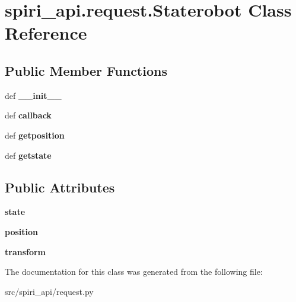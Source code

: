 \hypertarget{classspiri__api_1_1request_1_1_staterobot}{\section{spiri\-\_\-api.\-request.\-Staterobot \-Class \-Reference}
\label{classspiri__api_1_1request_1_1_staterobot}
}
\subsection*{\-Public \-Member \-Functions}
\begin{DoxyCompactItemize}
\item 
\hypertarget{classspiri__api_1_1request_1_1_staterobot_ae3e81ac6540cda7ce41cb9ac687cbff6}{def {\bfseries \-\_\-\-\_\-init\-\_\-\-\_\-}}\label{classspiri__api_1_1request_1_1_staterobot_ae3e81ac6540cda7ce41cb9ac687cbff6}

\item 
\hypertarget{classspiri__api_1_1request_1_1_staterobot_a32dd4e20d07c24f5cb292b97088fa1a5}{def {\bfseries callback}}\label{classspiri__api_1_1request_1_1_staterobot_a32dd4e20d07c24f5cb292b97088fa1a5}

\item 
\hypertarget{classspiri__api_1_1request_1_1_staterobot_a7f6d68da682b75115591c6e3889b536e}{def {\bfseries getposition}}\label{classspiri__api_1_1request_1_1_staterobot_a7f6d68da682b75115591c6e3889b536e}

\item 
\hypertarget{classspiri__api_1_1request_1_1_staterobot_ac1be2cdb64902058e65bc90fafead524}{def {\bfseries getstate}}\label{classspiri__api_1_1request_1_1_staterobot_ac1be2cdb64902058e65bc90fafead524}

\end{DoxyCompactItemize}
\subsection*{\-Public \-Attributes}
\begin{DoxyCompactItemize}
\item 
\hypertarget{classspiri__api_1_1request_1_1_staterobot_a273b7ea313a0874c5b9f489cab76e26a}{{\bfseries state}}\label{classspiri__api_1_1request_1_1_staterobot_a273b7ea313a0874c5b9f489cab76e26a}

\item 
\hypertarget{classspiri__api_1_1request_1_1_staterobot_a761f91db29a5269c96a778edfef8985d}{{\bfseries position}}\label{classspiri__api_1_1request_1_1_staterobot_a761f91db29a5269c96a778edfef8985d}

\item 
\hypertarget{classspiri__api_1_1request_1_1_staterobot_aef5196a7d7061152bbb761edcbecad7c}{{\bfseries transform}}\label{classspiri__api_1_1request_1_1_staterobot_aef5196a7d7061152bbb761edcbecad7c}

\end{DoxyCompactItemize}


\-The documentation for this class was generated from the following file\-:\begin{DoxyCompactItemize}
\item 
src/spiri\-\_\-api/request.\-py\end{DoxyCompactItemize}
